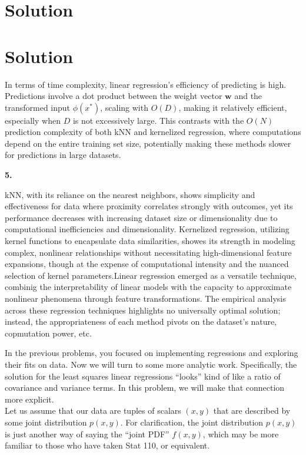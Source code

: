 \documentclass[submit]{harvardml}
\newenvironment{solution}
  {\color{blue}\section*{Solution}}
{}
\begin{document}
\begin{solution}
\begin{solution}
In terms of time complexity, linear regression's efficiency of predicting is high. Predictions involve a dot product between the weight vector \( \mathbf{w} \) and the transformed input \( \phi(x^*) \), scaling with \(O(D)\), making it relatively efficient, especially when \(D\) is not excessively large. This contrasts with the \(O(N)\) prediction complexity of both kNN and kernelized regression, where computations depend on the entire training set size, potentially making these methods slower for predictions in large datasets.

\bigskip
\textbf{5.}

kNN, with its reliance on the nearest neighbors, shows simplicity and effectiveness for data where proximity correlates strongly with outcomes, yet its performance decreases with increasing dataset size or dimensionality due to computational inefficiencies and dimensionality. Kernelized regression, utilizing kernel functions to encapsulate data similarities, showes its strength in modeling complex, nonlinear relationships without necessitating high-dimensional feature expansions, though at the expense of computational intensity and the nuanced selection of kernel parameters.Linear regression emerged as a versatile technique, combinig the interpretability of linear models with the capacity to approximate nonlinear phenomena through feature transformations. The empirical analysis across these regression techniques highlights no universally optimal solution; instead, the appropriateness of each method pivots on the dataset's nature, copmutation power, etc.

\end{solution}

\newpage
\begin{problem}

  In the previous problems, you focused on implementing regressions
  and exploring their fits on data. Now we will turn to some more
  analytic work.  Specifically, the solution for the least squares
  linear regressions ``looks'' kind of like a ratio of covariance and
  variance terms.  In this problem, we will make that connection more
  explicit. \\

  \noindent Let us assume that our data are tuples of scalars $(x,y)$ that are
  described by some joint distribution $p(x,y)$.  For clarification, the joint distribution $p(x,y)$ is just another way of saying the ``joint PDF'' $f(x,y)$, which may be more familiar to those who have taken Stat 110, or equivalent. \\
  

\end{problem}
\end{solution}
\end{document}
